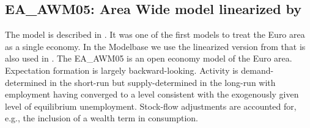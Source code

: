 \documentclass[11pt,a4paper]{article}
\begin{document}
	\subsection{EA\_AWM05: Area Wide model linearized by \cite{DieppeKuesterMcAdam2005}}
	\label{EAAWM05}
	The model is described in \cite{FaganHenryMestre2005}. It was one of the first models to treat the Euro area as a single economy. In the Modelbase we use the linearized version from \cite{DieppeKuesterMcAdam2005} that is also used in \cite{KuesterWieland2005}. The EA\_AWM05 is an open economy model of the Euro area. Expectation formation is largely backward-looking. Activity is demand-determined in the short-run but supply-determined in the long-run with employment having converged to a level consistent with the exogenously given level of equilibrium unemployment. Stock-flow adjustments are accounted for, e.g., the inclusion of a wealth term in consumption.
	
\end{document}
